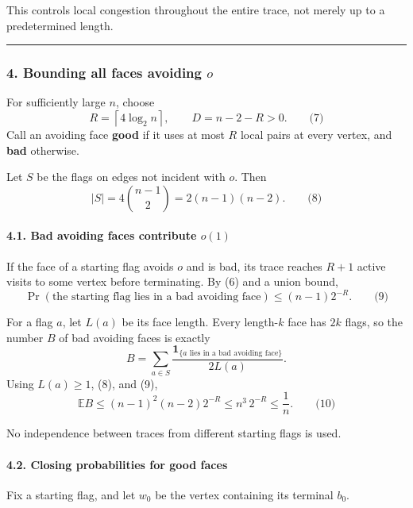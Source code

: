 \documentclass[
  11pt,
  a4paper,
]{article}
\begin{document}
This controls local congestion throughout the entire trace, not merely
up to a predetermined length.

\begin{center}\rule{0.5\linewidth}{0.5pt}\end{center}

\subsubsection{\texorpdfstring{4. Bounding all faces avoiding
\(o\)}{4. Bounding all faces avoiding o}}\label{bounding-all-faces-avoiding-o}

For sufficiently large \(n\), choose \[
R=\left\lceil4\log_2 n\right\rceil,
\qquad
D=n-2-R>0.
\qquad\text{(7)}
\] Call an avoiding face \textbf{good} if it uses at most \(R\) local
pairs at every vertex, and \textbf{bad} otherwise.

Let \(S\) be the flags on edges not incident with \(o\). Then \[
|S|=4\binom{n-1}{2}=2(n-1)(n-2).
\qquad\text{(8)}
\]

\paragraph{\texorpdfstring{4.1. Bad avoiding faces contribute
\(o(1)\)}{4.1. Bad avoiding faces contribute o(1)}}\label{bad-avoiding-faces-contribute-o1}

If the face of a starting flag avoids \(o\) and is bad, its trace
reaches \(R+1\) active visits to some vertex before terminating. By (6)
and a union bound, \[
\Pr(\text{the starting flag lies in a bad avoiding face})
\le (n-1)2^{-R}.
\qquad\text{(9)}
\]

For a flag \(a\), let \(L(a)\) be its face length. Every length-\(k\)
face has \(2k\) flags, so the number \(B\) of bad avoiding faces is
exactly \[
B=
\sum_{a\in S}
\frac{\mathbf 1_{\{a\text{ lies in a bad avoiding face}\}}}{2L(a)}.
\] Using \(L(a)\ge1\), (8), and (9), \[
\mathbb E B
\le
(n-1)^2(n-2)2^{-R}
\le n^3\,2^{-R}
\le \frac1n.
\qquad\text{(10)}
\]

No independence between traces from different starting flags is used.

\paragraph{4.2. Closing probabilities for good
faces}\label{closing-probabilities-for-good-faces}

Fix a starting flag, and let \(w_0\) be the vertex containing its
terminal \(b_0\).
\end{document}
